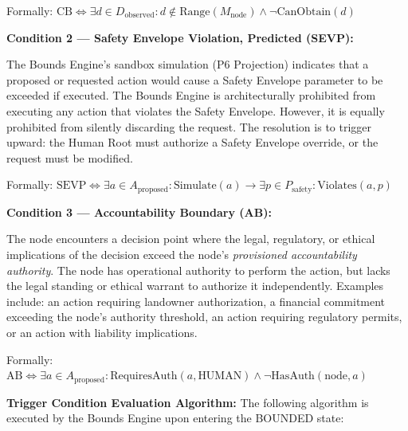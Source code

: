 Formally: $\text{CB} \iff \exists d \in D_\text{observed}: d \notin \text{Range}(M_\text{node}) \land \neg \text{CanObtain}(d)$

\medskip
\noindent\textbf{Condition 2 — Safety Envelope Violation, Predicted (SEVP):}

The Bounds Engine's sandbox simulation (P6 Projection) indicates that a proposed or requested action would cause a Safety Envelope parameter to be exceeded if executed. The Bounds Engine is architecturally prohibited from executing any action that violates the Safety Envelope. However, it is equally prohibited from silently discarding the request. The resolution is to trigger upward: the Human Root must authorize a Safety Envelope override, or the request must be modified.

Formally: $\text{SEVP} \iff \exists a \in A_\text{proposed}: \text{Simulate}(a) \rightarrow \exists p \in P_\text{safety}: \text{Violates}(a, p)$

\medskip
\noindent\textbf{Condition 3 — Accountability Boundary (AB):}

The node encounters a decision point where the legal, regulatory, or ethical implications of the decision exceed the node's \emph{provisioned accountability authority}. The node has operational authority to perform the action, but lacks the legal standing or ethical warrant to authorize it independently. Examples include: an action requiring landowner authorization, a financial commitment exceeding the node's authority threshold, an action requiring regulatory permits, or an action with liability implications.

Formally: $\text{AB} \iff \exists a \in A_\text{proposed}: \text{RequiresAuth}(a, \text{HUMAN}) \land \neg \text{HasAuth}(\text{node}, a)$

\medskip
\noindent\textbf{Trigger Condition Evaluation Algorithm:} The following algorithm is executed by the Bounds Engine upon entering the BOUNDED state:

